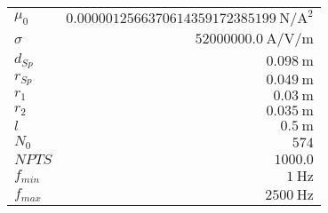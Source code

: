 
{%
    \begin{center}
    \label{tab:fitparams:cu:phi}
    \begin{tabular}{lr}
    \toprule
        $\mu_0$ & $\SI{0.0000012566370614359172385199}{\newton\per\ampere\squared}$\\
        $\sigma$ & $\SI{52000000.0}{\ampere\per\volt\per\meter}$\\
        $d_{Sp}$ & $\SI{0.098}{\meter}$\\
        $r_{Sp}$ & $\SI{0.049}{\meter}$\\
        $r_1$ & $\SI{0.03}{\meter}$\\
        $r_2$ & $\SI{0.035}{\meter}$\\
        $l$ & $\SI{0.5}{\meter}$\\
        $N_0$ & $\num{574}$\\
        $NPTS$ & $\num{1000.0}$\\
        $f_{min}$ & $\SI{1}{\hertz}$\\
        $f_{max}$ & $\SI{2500}{\hertz}$\\

    \bottomrule
    \end{tabular}
    \end{center}
}

